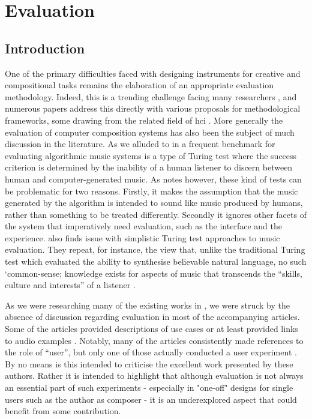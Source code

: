 \chapter{Evaluation}
\label{chap:evaluation}

\section{Introduction}

One of the primary difficulties faced with designing instruments for creative and compositional tasks remains the elaboration of an appropriate evaluation methodology. Indeed, this is a trending challenge facing many researchers \citep{Barbosa2015}, and numerous papers address this directly with various proposals for methodological frameworks, some drawing from the related field of \acrshort{hci} \citep{Hsu2009, Kiefer2008a, Hiraga2004}. More generally the evaluation of computer composition systems has also been the subject of much discussion in the literature. As we alluded to in  a frequent benchmark for evaluating algorithmic music systems is a type of Turing test where the success criterion is determined by the inability of a human listener to discern between human and computer-generated music. As \cite{Abdulla2002} notes however, these kind of tests can be problematic for two reasons. Firstly, it makes the assumption that the music generated by the algorithm is intended to sound like music produced by humans, rather than something to be treated differently. Secondly it ignores other facets of the system that imperatively need evaluation, such as the interface and the experience. \cite{Pachet2015} also finds issue with simplistic Turing test approaches to music evaluation. They repeat, for instance, the view that, unlike the traditional Turing test which evaluated the ability to synthesise believable natural language, no such `common-sense; knowledge exists for aspects of music that transcends the ``skills, culture and interests'' of a listener \citep{Pachet2015}.

As we were researching many of the existing works in , we were struck by the absence of discussion regarding evaluation in most of the accompanying articles. Some of the articles provided descriptions of use cases \citep{Cardle2003} or at least provided links to audio examples \citep{Sturm2004}. Notably, many of the articles \citep{Simon2005, Hackbarth2010} consistently made references to the role of “user”, but only one of those actually conducted a user experiment \citep{Aucouturier2005}. By no means is this intended to criticise the excellent work presented by these authors. Rather it is intended to highlight that although evaluation is not always an essential part of such experiments - especially in "one-off" designs for single users such as the author as composer - it is an underexplored aspect that could benefit from some contribution.

